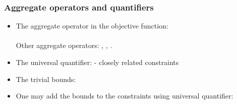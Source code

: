 \documentclass[landscape]{beamer}
\begin{document}
\begin{frame}
  \frametitle{Aggregate operators and quantifiers}
\begin{footnotesize}  
\begin{itemize}
\item The aggregate operator  \texttt{} in the objective function:\\
         \texttt{}\\
          Other aggregate operators: \texttt{}, \texttt{}, \texttt{}.
\item  The universal quantifier: \texttt{} - closely related constraints\\
          \texttt{}   
\item   The trivial bounds:          \\
           \texttt{}
\item    One may add the bounds to the constraints using universal quantifier:
            \texttt{}\\
            
            \texttt{}    
\end{itemize}
\end{footnotesize}  
  
\end{frame}
\end{document}
